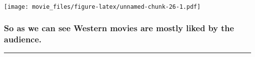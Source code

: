 \documentclass[
]{article}
\begin{document}
\texttt{[image: movie\_files/figure-latex/unnamed-chunk-26-1.pdf]}

\hypertarget{so-as-we-can-see-western-movies-are-mostly-liked-by-the-audience.}{%
\subsubsection{\texorpdfstring{\textbf{So as we can see Western movies
are mostly liked by the
audience.}}{So as we can see Western movies are mostly liked by the audience.}}\label{so-as-we-can-see-western-movies-are-mostly-liked-by-the-audience.}}

\begin{center}\rule{0.5\linewidth}{0.5pt}\end{center}
\end{document}
